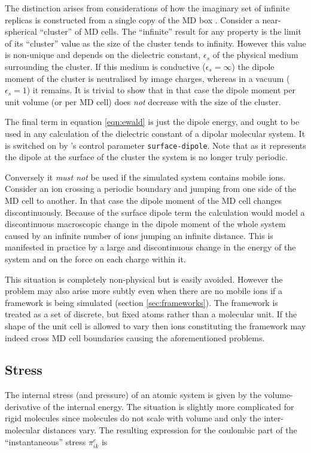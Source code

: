 The distinction arises from considerations of how the imaginary set of
infinite replicas is constructed from a single copy of the MD box
\cite[pp 156-159]{allen:87}.  Consider a near-spherical ``cluster''
of MD cells.  The ``infinite'' result for any property is the limit of
its ``cluster'' value as the size of the cluster tends to infinity.
However this value is non-unique and depends on the dielectric
constant, $\epsilon_s$ of the physical medium surrounding the cluster.
If this medium is conductive ($\epsilon_s=\infty$) the dipole
moment of the cluster is neutralised by image charges, whereas in a
vacuum ($\epsilon_s=1$) it remains.  It is trivial to show that
in that case the dipole moment per unit volume (or per MD cell) does
{\em not} decrease with the size of the cluster.

The final term in equation \ref{eqn:ewald} is just the dipole energy,
and ought to be used in any calculation of the dielectric constant of
a dipolar molecular system.  It is switched on by \moldy's control
parameter \verb+surface-dipole+.  Note that as it represents the
dipole at the surface of the cluster the system is no longer truly
periodic.

Conversely it {\em must not} be used if the simulated system contains
mobile ions.  Consider an ion crossing a periodic boundary and jumping
from one side of the MD cell to another.  In that case the dipole
moment of the MD cell changes discontinuously.   Because of the
surface dipole term the calculation would model a discontinuous
macroscopic change in the dipole moment of the whole system caused by
an infinite number of ions jumping an infinite distance.  This is
manifested in practice by a large and discontinuous change in the
energy of the system and on the force on each charge within it.

This situation is completely non-physical but is easily avoided.
However the problem may also arise more subtly even when there are no
mobile ions if a framework is being simulated (section
\ref{sec:frameworks}).  The framework is treated as a set of discrete,
but fixed atoms rather than a molecular unit.  If the shape of the
unit cell is allowed to vary then ions constituting the framework may
indeed cross MD cell boundaries causing the aforementioned problems.

\subsection*{Stress}

The internal stress (and pressure) of an atomic system is given by the
volume-derivative of the internal energy.  The situation is slightly
more complicated for rigid molecules since molecules do not scale with
volume and only the inter-molecular distances vary.  The resulting
expression for the coulombic part of the ``instantaneous'' stress
$\pi_{ik}^e$ is \cite[Appendix A]{nose:83}

